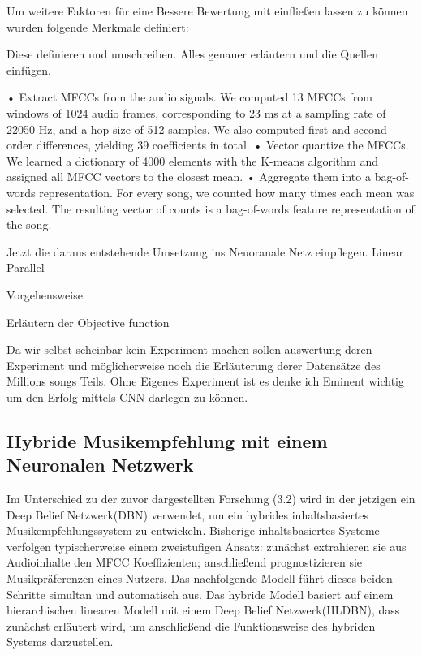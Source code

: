 \documentclass[twosided,a4,10pt]{article}
\begin{document}
\begin{multicols}{2}
		
		Um weitere Faktoren für eine Bessere Bewertung mit einfließen lassen zu können wurden folgende Merkmale definiert:
		
		Diese definieren und umschreiben. Alles genauer erläutern und die Quellen einfügen.
		
		• Extract MFCCs from the audio signals. We computed 13 MFCCs from windows of 1024
		audio frames, corresponding to 23 ms at a sampling rate of 22050 Hz, and a hop size of 512
		samples. We also computed first and second order differences, yielding 39 coefficients in total.
		• Vector quantize the MFCCs. We learned a dictionary of 4000 elements with the K-means
		algorithm and assigned all MFCC vectors to the closest mean.
		• Aggregate them into a bag-of-words representation. For every song, we counted how many
		times each mean was selected. The resulting vector of counts is a bag-of-words feature representation
		of the song.
		
		Jetzt die daraus entstehende Umsetzung ins Neuoranale Netz einpflegen.
		Linear
		Parallel
		
		Vorgehensweise
		
		Erläutern der Objective function
		
		Da wir selbst scheinbar kein Experiment machen sollen auswertung deren Experiment und möglicherweise noch die Erläuterung derer Datensätze des Millions songs Teils.
		Ohne Eigenes Experiment ist es denke ich Eminent wichtig um den Erfolg mittels CNN darlegen zu können.

		\subsection{Hybride Musikempfehlung mit einem Neuronalen Netzwerk}
		Im Unterschied zu der zuvor dargestellten Forschung (3.2) wird in der jetzigen ein Deep Belief Netzwerk(DBN) verwendet, um ein hybrides inhaltsbasiertes Musikempfehlungssystem zu entwickeln. Bisherige inhaltsbasiertes Systeme verfolgen typischerweise einem zweistufigen Ansatz: zunächst extrahieren sie aus Audioinhalte den MFCC Koeffizienten; anschließend prognostizieren sie Musikpräferenzen eines Nutzers. Das nachfolgende Modell führt dieses beiden Schritte simultan und automatisch aus. \cite{wang}\newline
		Das hybride Modell basiert auf einem hierarchischen linearen Modell mit einem Deep Belief Netzwerk(HLDBN), dass zunächst erläutert wird, um anschließend die Funktionsweise des hybriden Systems darzustellen.
		

\end{multicols}
\end{document}
